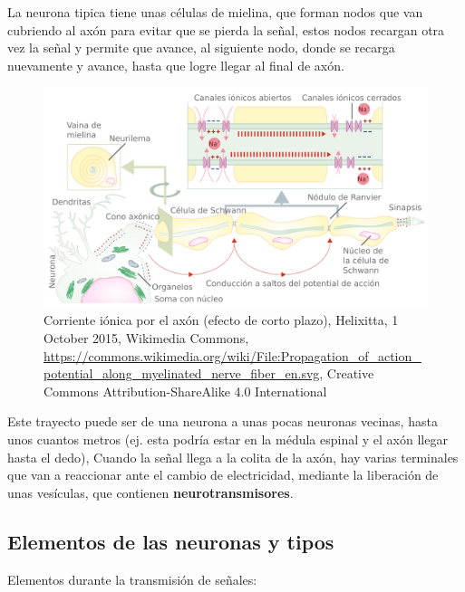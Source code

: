 La neurona tipica tiene unas células de mielina, que forman nodos que van cubriendo al axón para evitar que se pierda la señal, estos nodos recargan otra vez la señal y permite que avance, al siguiente nodo, donde se recarga  nuevamente y avance, hasta que logre llegar al final de axón.

\begin{figure}[h]
 \centering
 \includegraphics[scale=0.1]{../Figuras/Saltos.png}
 \caption{Corriente iónica por el axón (efecto de corto plazo), Helixitta, 1 October 2015, Wikimedia Commons, \url{https://commons.wikimedia.org/wiki/File:Propagation_of_action_potential_along_myelinated_nerve_fiber_en.svg}, Creative Commons Attribution-ShareAlike 4.0 International}
 \label{fig:conduccionSaltos}
\end{figure}

Este trayecto puede ser de una neurona a unas pocas neuronas vecinas, hasta unos cuantos metros (ej. esta podría estar en la médula espinal y el axón llegar hasta el dedo), Cuando la señal llega a la colita de la axón, hay varias terminales que van a reaccionar ante el cambio de electricidad, mediante la liberación de unas vesículas, que contienen \textbf{neurotransmisores}.


\subsection{Elementos de las neuronas y tipos}

Elementos durante la transmisión de señales:

